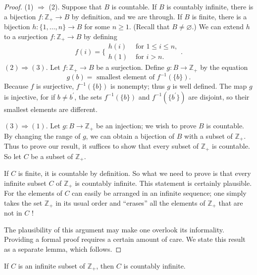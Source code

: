 \begin{proof}
 (1) \(\Rightarrow\) (2). Suppose that \(B\) is countable. If \(B\) is countably infinite, there is a bijection \(f : \mathbb{Z}_{+} \rightarrow B\) by definition, and we are through. If \(B\) is finite, there is a bijection \(h : \{1,\ldots, n\} \rightarrow B\) for some \(n \geq 1\). (Recall that \(B \neq \varnothing\).) We can extend \(h\) to a surjection \(f : \mathbb{Z}_{+} \rightarrow B\) by defining
 \[
 f(i) = \{ \begin{array}{ll} h(i) & \text{ for }1 \leq i \leq n, \\ h(1) & \text{ for }i > n. \end{array}.
 \]
 \((2) \Rightarrow ( 3)\). Let \(f : \mathbb{Z}_{+} \rightarrow B\) be a surjection. Define \(g : B \rightarrow {\mathbb{Z}}_{+}\) by the equation
 \[
 g(b) = \text{ smallest element of }f^{-1}({\{ b\} }).
 \]
 Because \(f\) is surjective, \(f^{-1}({\{ b\} })\) is nonempty; thus \(g\) is well defined. The map \(g\) is injective, for if \(b \neq {b}^{\prime }\), the sets \(f^{-1}({\{ b\} })\) and \(f^{-1}( \{ b^{\prime }\} )\) are disjoint, so their smallest elements are different.
 
 \(( 3) \Rightarrow (1)\). Let \(g : B \rightarrow {\mathbb{Z}}_{+}\) be an injection; we wish to prove \(B\) is countable. By changing the range of \(g\), we can obtain a bijection of \(B\) with a subset of \(\mathbb{Z}_{+}\). Thus to prove our result, it suffices to show that every subset of \(\mathbb{Z}_{+}\) is countable. So let \(C\) be a subset of \(\mathbb{Z}_{+}\).

 If \(C\) is finite, it is countable by definition. So what we need to prove is that every infinite subset \(C\) of \(\mathbb{Z}_{+}\) is countably infinite. This statement is certainly plausible. For the elements of \(C\) can easily be arranged in an infinite sequence; one simply takes the set \(\mathbb{Z}_{+}\) in its usual order and ``erases'' all the elements of \(\mathbb{Z}_{+}\) that are not in \(C\) !

 The plausibility of this argument may make one overlook its informality. Providing a formal proof requires a certain amount of care. We state this result as a separate lemma, which follows.
\end{proof}

\begin{lemma}
\label{lem:\thetheorem}
 If \(C\) is an infinite subset of \(\mathbb{Z}_{+}\), then \(C\) is countably infinite.
\end{lemma}

